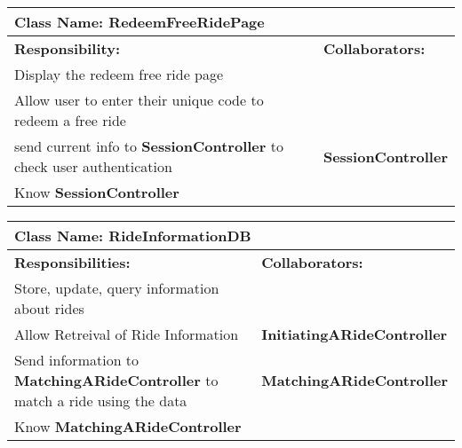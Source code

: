 \documentclass[]{article}
\begin{document}
\begin{table}[H]
        \centering
        \begin{tabular}{|p{5cm}|p{5cm}|}
        \hline 
         \multicolumn{2}{|l|}{\textbf{Class Name:} RedeemFreeRidePage} \\
        \hline
        \textbf{Responsibility:} & \textbf{Collaborators:} \\
        \hline
        Display the redeem free ride page &  \phantom{} \\
        \hline
        Allow user to enter their unique code to redeem a free ride & \phantom{} \\
        \hline
        send current info to \textbf{SessionController} to check user authentication & \textbf{SessionController} \\
        \hline
         Know \textbf{SessionController}  & \phantom{} \\
        \hline
        \end{tabular}
    \end{table}

\begin{table}[H]
    \centering
    \begin{tabular}{|p{5cm}|p{5cm}|}
        \hline 
        \multicolumn{2}{|l|}{\textbf{Class Name:} RideInformationDB} \\
        \hline
        \textbf{Responsibilities:} & \textbf{Collaborators:} \\
        \hline
        Store, update, query information about rides & \phantom{} \\
        \hline
        Allow Retreival of Ride Information & 
        \textbf{InitiatingARideController} \\ 
        \hline
        Send information to \textbf{MatchingARideController} to match a ride using the data &  \textbf{MatchingARideController}\\
        \hline
        Know \textbf{MatchingARideController}  & \phantom{} \\
        \hline
        
    \end{tabular}
\end{table}
\end{document}
